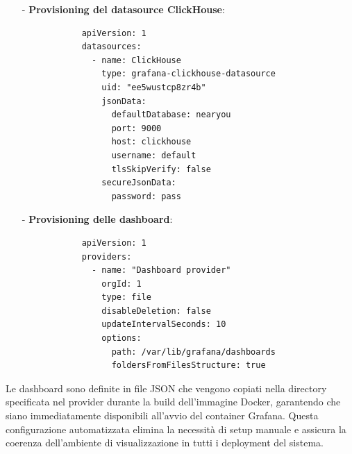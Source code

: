 \documentclass[10pt]{article}
\newcommand{\myparagraph}[1]{\paragraph{#1}\mbox{}\\}
\newcommand{\mysubparagraph}[1]{\subparagraph{#1}\mbox{}\\}
\begin{document}
        \begin{itemize}
            \item[-] \textbf{Provisioning del datasource ClickHouse}:
            \begin{lstlisting}
            apiVersion: 1
            datasources:
              - name: ClickHouse
                type: grafana-clickhouse-datasource
                uid: "ee5wustcp8zr4b"
                jsonData:
                  defaultDatabase: nearyou
                  port: 9000
                  host: clickhouse
                  username: default
                  tlsSkipVerify: false
                secureJsonData:
                  password: pass
            \end{lstlisting}

            \item[-] \textbf{Provisioning delle dashboard}:
            \begin{lstlisting}
            apiVersion: 1
            providers:
              - name: "Dashboard provider"
                orgId: 1
                type: file
                disableDeletion: false
                updateIntervalSeconds: 10
                options:
                  path: /var/lib/grafana/dashboards
                  foldersFromFilesStructure: true
            \end{lstlisting}
        \end{itemize}

        Le dashboard sono definite in file JSON che vengono copiati nella directory specificata nel provider durante la build dell'immagine Docker, garantendo che siano immediatamente disponibili all'avvio del container Grafana. Questa configurazione automatizzata elimina la necessità di setup manuale e assicura la coerenza dell'ambiente di visualizzazione in tutti i deployment del sistema.


\end{document}
